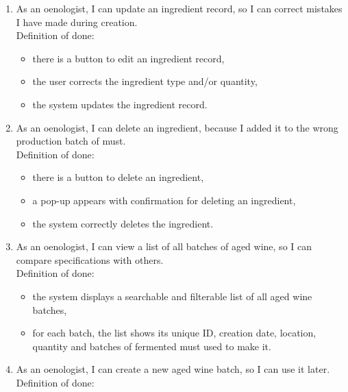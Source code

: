 \begin{enumerate}
	\begin{itemize}
		\item there is a button to add ingredient to a specific production batch of must,
		\item the user enters the ingredient type and quantity,
		\item the system records information about the components of a given batch.
	\end{itemize}
	\item As an oenologist, I can update an ingredient record, so I can correct mistakes I have made during creation.
	\\Definition of done:
	\begin{itemize}
		\item there is a button to edit an ingredient record,
		\item the user corrects the ingredient type and/or quantity,
		\item the system updates the ingredient record.
	\end{itemize}
	\item As an oenologist, I can delete an ingredient, because I added it to the wrong production batch of must.
	\\Definition of done:
	\begin{itemize}
		\item there is a button to delete an ingredient,
		\item a pop-up appears with confirmation for deleting an ingredient,
		\item the system correctly deletes the ingredient.
	\end{itemize}
	\item As an oenologist, I can view a list of all batches of aged wine, so I can compare specifications with others.
	\\Definition of done:
	\begin{itemize}
		\item the system displays a searchable and filterable list of all aged wine batches,
		\item for each batch, the list shows its unique ID, creation date, location, quantity and batches of fermented must used to make it.
	\end{itemize}
	\item As an oenologist, I can create a new aged wine batch, so I can use it later.
	\\Definition of done:

\end{enumerate}
